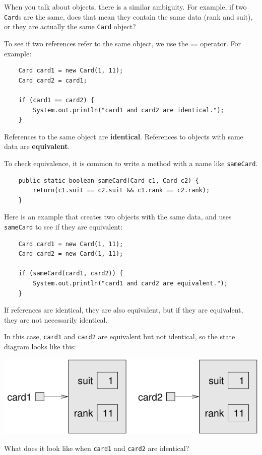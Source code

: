 \documentclass[12pt]{book}
\theoremstyle{exercise}
\begin{document}
When you talk about objects, there is a similar ambiguity.  For
example, if two {\tt Card}s are the same, does that mean they
contain the same data (rank and suit), or they are actually
the same {\tt Card} object?

To see if two references refer to the same object, we use
the {\tt ==} operator.  For example:

\begin{lstlisting}
    Card card1 = new Card(1, 11);
    Card card2 = card1;

    if (card1 == card2) {
        System.out.println("card1 and card2 are identical.");
    }
\end{lstlisting}
%
References to
the same object are {\bf identical}.  References
to objects with same data are {\bf equivalent}.

To check equivalence, it
is common to write a method with a name like {\tt sameCard}.

\begin{lstlisting}
    public static boolean sameCard(Card c1, Card c2) {
        return(c1.suit == c2.suit && c1.rank == c2.rank);
    }
\end{lstlisting}
%
Here is an example that creates two objects with the same data,
and uses {\tt sameCard} to see if they are equivalent:

\begin{lstlisting}
    Card card1 = new Card(1, 11);
    Card card2 = new Card(1, 11);

    if (sameCard(card1, card2)) {
        System.out.println("card1 and card2 are equivalent.");
    }
\end{lstlisting}
%
If references are identical, they are also equivalent,
but if they are equivalent, they are not necessarily identical.

In this case, {\tt card1} and {\tt card2}
are equivalent but not identical, so
the state diagram looks like this:

\includegraphics{figs/card.pdf}

What does it look like when
{\tt card1} and {\tt card2} are identical?
\end{document}
